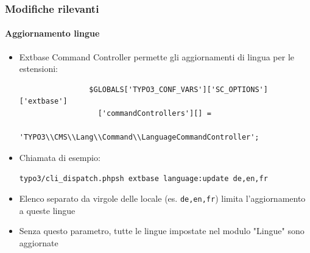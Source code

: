 
\begin{frame}[fragile]
	\frametitle{Modifiche rilevanti}
	\framesubtitle{Aggiornamento lingue}

	\begin{itemize}
		\item Extbase Command Controller permette gli aggiornamenti di lingua per le estensioni:

			\begin{lstlisting}
				$GLOBALS['TYPO3_CONF_VARS']['SC_OPTIONS']['extbase']
				  ['commandControllers'][] =
				  'TYPO3\\CMS\\Lang\\Command\\LanguageCommandController';
			\end{lstlisting}

		\item Chiamata di esempio:

			\lstinline!typo3/cli_dispatch.phpsh extbase language:update de,en,fr!

		\item Elenco separato da virgole delle locale (es. \texttt{de,en,fr}) limita l'aggiornamento a queste lingue
		\item Senza questo parametro, tutte le lingue impostate nel modulo "Lingue" sono aggiornate

	\end{itemize}

\end{frame}


